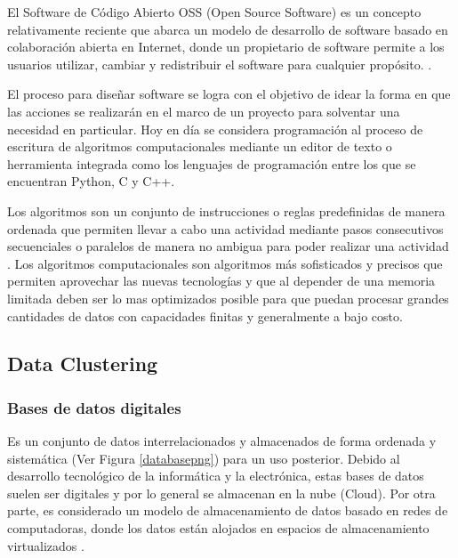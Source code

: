 El Software de Código Abierto OSS (Open Source Software) es un concepto relativamente reciente que abarca un modelo de desarrollo de software basado en colaboración abierta en Internet, donde un propietario de software permite a los usuarios utilizar, cambiar y redistribuir el software para cualquier propósito. \cite{Defopensource}.

El proceso para  diseñar software se logra con el objetivo de idear la forma en que las acciones se realizarán en el marco de un proyecto para solventar una necesidad en particular. Hoy en día se considera programación al proceso de escritura de algoritmos computacionales mediante un editor de texto o herramienta integrada como los lenguajes de programación entre los que se encuentran Python, C y C++.

Los algoritmos son un conjunto de instrucciones o reglas predefinidas de manera ordenada que permiten llevar a cabo una actividad mediante pasos consecutivos secuenciales o paralelos de manera no ambigua para poder realizar una actividad \cite{algoritmo}. Los algoritmos computacionales son algoritmos más sofisticados y precisos que permiten aprovechar las nuevas tecnologías y que al depender de una memoria limitada deben ser lo mas optimizados posible para que puedan procesar grandes cantidades de datos con capacidades finitas y generalmente a bajo costo.

    


\subsection{Data Clustering}

\subsubsection{Bases de datos digitales}
Es un conjunto de datos interrelacionados y almacenados de forma ordenada y sistemática (Ver Figura \ref{databasepng}) para un uso posterior\cite{database}. Debido al desarrollo tecnológico de la informática y la electrónica, estas bases de datos suelen ser digitales y por lo general se almacenan en la nube (Cloud). Por otra parte, es considerado un modelo de almacenamiento de datos basado en redes de computadoras, donde los datos están alojados en espacios de almacenamiento virtualizados \cite{cloud}.


